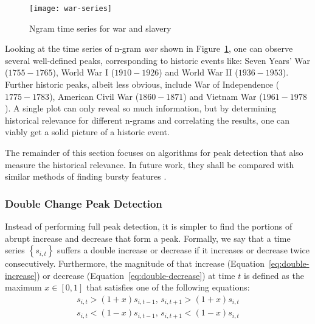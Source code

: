 
\begin{figure}[t]
\centering
\texttt{[image: war-series]}
\caption{Ngram time series for war and slavery}
\label{fig:war-series}
\end{figure}


Looking at the time series of n-gram \textit{war} shown in Figure~\ref{fig:war-series}, one can observe several well-defined peaks, corresponding to historic events like: Seven Years' War ($1755 - 1765$), World War I ($1910 - 1926$) and World War II ($1936 - 1953$). Further historic peaks, albeit less obvious, include War of Independence ($1775 - 1783$), American Civil War ($1860 - 1871$) and Vietnam War ($1961 - 1978$). A single plot can only reveal so much information, but by determining historical relevance for different n-grams and correlating the results, one can viably get a solid picture of a historic event.

The remainder of this section focuses on algorithms for peak detection that also measure the historical relevance. In future work, they shall be compared with similar methods of finding bursty features .

\subsubsection{Double Change Peak Detection}

Instead of performing full peak detection, it is simpler to find the portions of abrupt increase and decrease that form a peak. Formally, we say that a time series $\left\{ s_{i, t} \right\}$ suffers a double increase or decrease if it increases or decrease twice consecutively. Furthermore, the magnitude of that increase (Equation~\ref{eq:double-increase}) or decrease (Equation~\ref{eq:double-decrease}) at time $t$ is defined as the maximum $x \in \left[ 0, 1 \right]$ that satisfies one of the following equations:
\begin{align}
\label{eq:double-increase}
s_{i, t} > \left( 1 + x \right) s_{i, t - 1}, \, s_{i, t + 1} > \left( 1 + x \right) s_{i, t}
\\
\label{eq:double-decrease}
s_{i, t} < \left( 1 - x \right) s_{i, t - 1}, \, s_{i, t + 1} < \left( 1 - x \right) s_{i, t}
\end{align}

